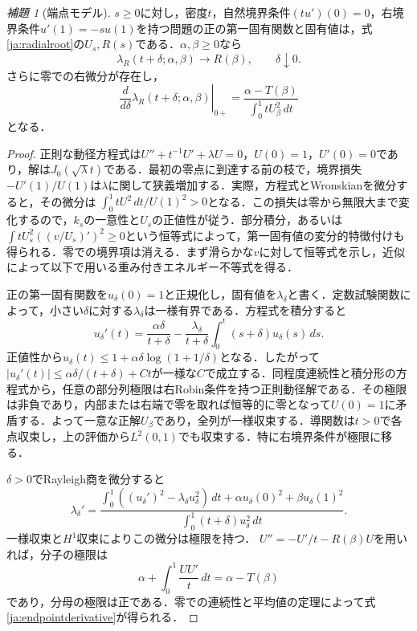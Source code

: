 \documentclass[12pt]{amsart}
\theoremstyle{definition}
\theoremstyle{remark}
\numberwithin{equation}{section}
\newtheorem{jlem}[thm]{補題}
\begin{document}
\begin{jlem}[端点モデル]\label{ja:endpoint}
$s\ge0$に対し，密度$t$，自然境界条件$(tu')(0)=0$，右境界条件$u'(1)=-su(1)$を持つ問題の正の第一固有関数と固有値は，式\eqref{ja:radialroot}の$U_s,R(s)$である．$\alpha,\beta\ge0$なら
\[
 \lambda_R(t+\delta;\alpha,\beta)\longrightarrow R(\beta),\qquad\delta\downarrow0.
\]
さらに零での右微分が存在し，
\begin{equation}\label{ja:endpointderivative}
 \left.\frac{d}{d\delta}\lambda_R(t+\delta;\alpha,\beta)\right|_{0+}
 =\frac{\alpha-T(\beta)}{\int_0^1tU_\beta^2\,dt}
\end{equation}
となる．
\end{jlem}
\begin{proof}
正則な動径方程式は$U''+t^{-1}U'+\lambda U=0$，$U(0)=1$，$U'(0)=0$であり，解は$J_0(\sqrt\lambda t)$である．最初の零点に到達する前の枝で，境界損失$-U'(1)/U(1)$は$\lambda$に関して狭義増加する．実際，方程式とWronskianを微分すると，その微分は
$\int_0^1tU^2\,dt/U(1)^2>0$となる．この損失は零から無限大まで変化するので，$k_s$の一意性と$U_s$の正値性が従う．部分積分，あるいは
$\int tU_s^2((v/U_s)')^2\ge0$という恒等式によって，第一固有値の変分的特徴付けも得られる．零での境界項は消える．まず滑らかな$v$に対して恒等式を示し，近似によって以下で用いる重み付きエネルギー不等式を得る．

正の第一固有関数を$u_\delta(0)=1$と正規化し，固有値を$\lambda_\delta$と書く．定数試験関数によって，小さい$\delta$に対する$\lambda_\delta$は一様有界である．方程式を積分すると
\[
 u_\delta'(t)=\frac{\alpha\delta}{t+\delta}
 -\frac{\lambda_\delta}{t+\delta}\int_0^t(s+\delta)u_\delta(s)\,ds.
\]
正値性から$u_\delta(t)\le1+\alpha\delta\log(1+1/\delta)$となる．したがって
$|u_\delta'(t)|\le\alpha\delta/(t+\delta)+Ct$が一様な$C$で成立する．同程度連続性と積分形の方程式から，任意の部分列極限は右Robin条件を持つ正則動径解である．その極限は非負であり，内部または右端で零を取れば恒等的に零となって$U(0)=1$に矛盾する．よって一意な正解$U_\beta$であり，全列が一様収束する．導関数は$t>0$で各点収束し，上の評価から$L^2(0,1)$でも収束する．特に右境界条件が極限に移る．

$\delta>0$でRayleigh商を微分すると
\[
 \lambda_\delta'=
 \frac{\int_0^1((u_\delta')^2-\lambda_\delta u_\delta^2)\,dt
 +\alpha u_\delta(0)^2+\beta u_\delta(1)^2}
 {\int_0^1(t+\delta)u_\delta^2\,dt}.
\]
一様収束と$H^1$収束によりこの微分は極限を持つ．
$U''=-U'/t-R(\beta)U$を用いれば，分子の極限は
\[
 \alpha+\int_0^1\frac{UU'}t\,dt=\alpha-T(\beta)
\]
であり，分母の極限は正である．零での連続性と平均値の定理によって式\eqref{ja:endpointderivative}が得られる．
\end{proof}
\end{document}
